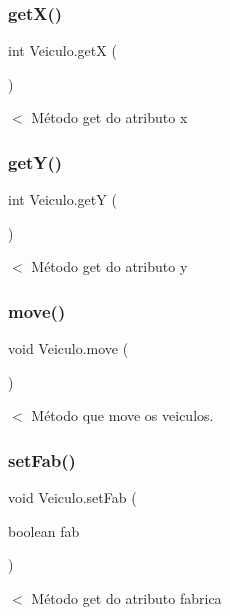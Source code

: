 \subsubsection{\texorpdfstring{get\+X()}{getX()}}
{\footnotesize\ttfamily int Veiculo.\+getX (\begin{DoxyParamCaption}{ }\end{DoxyParamCaption})}

$<$ Método get do atributo x \mbox{\label{class_veiculo_a06b2a923e51186673a016f75d10363d3}} 
\subsubsection{\texorpdfstring{get\+Y()}{getY()}}
{\footnotesize\ttfamily int Veiculo.\+getY (\begin{DoxyParamCaption}{ }\end{DoxyParamCaption})}

$<$ Método get do atributo y \mbox{\label{class_veiculo_a3341b0ed6b4d34db990a31f7a499ae80}} 
\subsubsection{\texorpdfstring{move()}{move()}}
{\footnotesize\ttfamily void Veiculo.\+move (\begin{DoxyParamCaption}{ }\end{DoxyParamCaption})}

$<$ Método que move os veiculos. \mbox{\label{class_veiculo_af740c4bac90ecf0936dbdab300cf5776}} 
\subsubsection{\texorpdfstring{set\+Fab()}{setFab()}}
{\footnotesize\ttfamily void Veiculo.\+set\+Fab (\begin{DoxyParamCaption}\item[{boolean}]{fab }\end{DoxyParamCaption})}

$<$ Método get do atributo fabrica \mbox{\label{class_veiculo_a6d69355a635fa5c8d40ec87e3d6f9c10}} 
